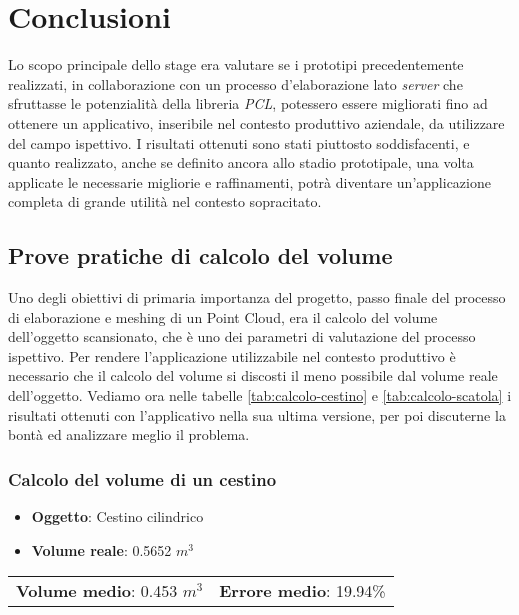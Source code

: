 
\chapter{Conclusioni}
\label{cap:conclusioni}
Lo scopo principale dello stage era valutare se i prototipi precedentemente realizzati, in collaborazione con un processo d'elaborazione lato \emph{server} che sfruttasse le potenzialità della libreria \emph{PCL}, potessero essere migliorati fino ad ottenere un applicativo, inseribile nel contesto produttivo aziendale, da utilizzare del campo ispettivo. 
I risultati ottenuti sono stati piuttosto soddisfacenti, e quanto realizzato, anche se definito ancora allo stadio prototipale, una volta applicate le necessarie migliorie e raffinamenti, potrà diventare un'applicazione completa di grande utilità nel contesto sopracitato.

\section{Prove pratiche di calcolo del volume}
Uno degli obiettivi di primaria importanza del progetto, passo finale del processo di elaborazione e meshing di un Point Cloud, era il calcolo del volume dell'oggetto scansionato, che è uno dei parametri di valutazione del processo ispettivo.
Per rendere l'applicazione utilizzabile nel contesto produttivo è necessario che il calcolo del volume si discosti il meno possibile dal volume reale dell'oggetto. 
Vediamo ora nelle tabelle \ref{tab:calcolo-cestino} e \ref{tab:calcolo-scatola} i risultati ottenuti con l'applicativo nella sua ultima versione, per poi discuterne la bontà ed analizzare meglio il problema.
\subsection{Calcolo del volume di un cestino}
\begin{itemize}
\item \textbf{Oggetto}: Cestino cilindrico
\item \textbf{Volume reale}: 0.5652 $ m^3 $
\end{itemize}
\begin{tabular}{l r}
\textbf{Volume medio}: 0.453 $m^3$ & \hspace{115pt} \textbf{Errore medio}: 19.94\% \\
\end{tabular}
\newline

